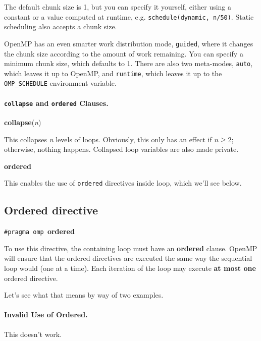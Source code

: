 \documentclass[a4paper]{report}
\begin{document}
The default chunk size is 1, but you can specify it yourself, either
using a constant or a value computed at runtime, e.g. 
{\tt schedule(dynamic, n/50)}. Static scheduling also accepts a
chunk size.

OpenMP has an even smarter work distribution mode, {\tt guided}, where
it changes the chunk size according to the amount of work remaining.
You can specify a minimum chunk size, which defaults to 1. There
are also two meta-modes, {\tt auto}, which leaves it up to OpenMP, and
{\tt runtime}, which leaves it up to the \verb+OMP_SCHEDULE+ environment
variable.



\paragraph{{\tt collapse} and {\tt ordered} Clauses.}

  \begin{center}
    {\bf collapse}({\it n})
  \end{center}

    This collapses {\it n} levels of loops. Obviously, this only has
    an effect if $n \ge 2$; otherwise, nothing happens. Collapsed loop
    variables are also made private.

  \begin{center}
    {\bf ordered}
  \end{center}
  
    This enables the use of {\tt ordered} directives inside loop, which we'll see below.

\subsection*{Ordered directive}
  \begin{center}
    {\tt \#pragma omp }{\bf ordered}
  \end{center}

    To use this directive, the containing loop must have an {\bf ordered} clause.
    OpenMP will ensure that the ordered directives are executed the same
      way the sequential loop would (one at a time).
    Each iteration of the loop may execute {\bf at most one} ordered
      directive.

Let's see what that means by way of two examples.

\paragraph{Invalid Use of Ordered.} This doesn't work.
\end{document}
